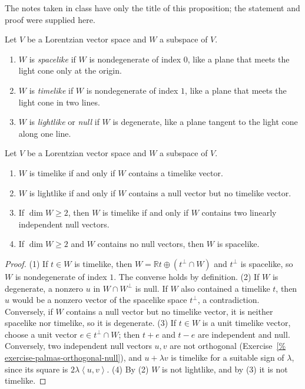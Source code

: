 The notes taken in class have only the
title of this proposition; the statement
and proof were supplied here.

\begin{definition}
\label{definition-palmas-causal-subspace}
Let $V$ be a Lorentzian vector space and
$W$ a subspace of $V$.
\begin{enumerate}
\item $W$ is \emph{spacelike} if $W$ is
nondegenerate of index $0$, like a plane
that meets the light cone only at the
origin.
\item $W$ is \emph{timelike} if $W$ is
nondegenerate of index $1$, like a plane
that meets the light cone in two lines.
\item $W$ is \emph{lightlike} or
\emph{null} if $W$ is degenerate, like a
plane tangent to the light cone along one
line.
\end{enumerate}
\end{definition}

\begin{proposition}
\label{proposition-palmas-subspace-criteria}
Let $V$ be a Lorentzian vector space and
$W$ a subspace of $V$.
\begin{enumerate}
\item $W$ is timelike if and only if $W$
contains a timelike vector.
\item $W$ is lightlike if and only if $W$
contains a null vector but no timelike
vector.
\item If $\dim W\geq 2$, then $W$ is
timelike if and only if $W$ contains two
linearly independent null vectors.
\item If $\dim W\geq 2$ and $W$ contains no
null vectors, then $W$ is spacelike.
\end{enumerate}
\end{proposition}

\begin{proof}
(1) If $t\in W$ is timelike, then
$W=\mathbb{R}t\oplus(t^{\perp}\cap W)$
and $t^{\perp}$ is spacelike, so $W$ is
nondegenerate of index $1$. The converse
holds by definition.
(2) If $W$ is degenerate, a nonzero $u$ in
$W\cap W^{\perp}$ is null. If $W$ also
contained a timelike $t$, then $u$ would
be a nonzero vector of the spacelike
space $t^{\perp}$, a contradiction.
Conversely, if $W$ contains a null vector
but no timelike vector, it is neither
spacelike nor timelike, so it is
degenerate.
(3) If $t\in W$ is a unit timelike vector,
choose a unit vector $e\in t^{\perp}\cap W$;
then $t+e$ and $t-e$ are independent and
null. Conversely, two independent null
vectors $u,v$ are not orthogonal
(Exercise~\ref{%
exercise-palmas-orthogonal-null}),
and $u+\lambda v$ is timelike for a
suitable sign of $\lambda$, since its
square is
$2\lambda\left\langle{} u,v
\right\rangle{}$.
(4) By (2) $W$ is not lightlike, and by (3)
it is not timelike.
\end{proof}

